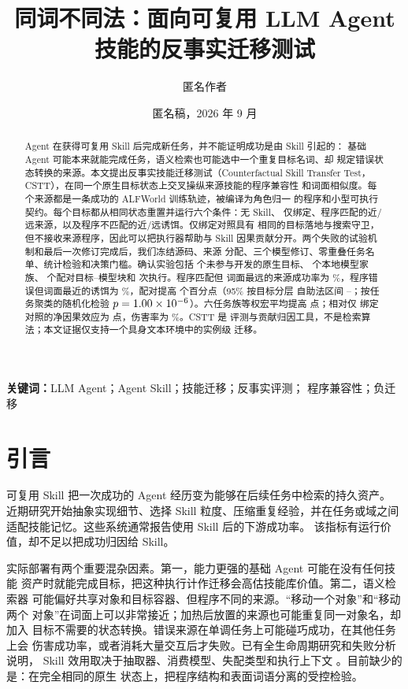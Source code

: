 \documentclass[10pt]{article}
\title{同词不同法：面向可复用 LLM Agent 技能的反事实迁移测试}
\author{匿名作者}
\date{匿名稿，2026 年 9 月}
\begin{document}
\maketitle

\begin{abstract}
Agent 在获得可复用 Skill 后完成新任务，并不能证明成功是由 Skill 引起的：
基础 Agent 可能本来就能完成任务，语义检索也可能选中一个重复目标名词、却
规定错误状态转换的来源。本文提出反事实技能迁移测试（Counterfactual Skill
Transfer Test，CSTT），在同一个原生目标状态上交叉操纵来源技能的程序兼容性
和词面相似度。每个来源都是一条成功的 ALFWorld 训练轨迹，被编译为角色归一
的程序和小型可执行契约。每个目标都从相同状态重置并运行六个条件：无 Skill、
仅绑定、程序匹配的近/远来源，以及程序不匹配的近/远诱饵。仅绑定对照具有
相同的目标落地与搜索守卫，但不接收来源程序，因此可以把执行器帮助与 Skill
因果贡献分开。两个失败的试验机制和最后一次修订完成后，我们冻结源码、来源
分配、三个模型修订、零重叠任务名单、统计检验和决策门槛。确认实验包括
\TargetCount{} 个未参与开发的原生目标、\ModelCount{} 个本地模型家族、
\BlockCount{} 个配对目标--模型块和 \EpisodeCount{} 次执行。程序匹配但
词面最远的来源成功率为 \MatchedFarRate\%，程序错误但词面最近的诱饵为
\LureNearRate\%，配对提高 \PrimaryEffect{} 个百分点（95\% 按目标分层
自助法区间 \PrimaryCILow--\PrimaryCIHigh；按任务聚类的随机化检验
$p=1.00\times 10^{-6}$）。六任务族等权宏平均提高 \MacroEffect{} 点；相对仅
绑定对照的净因果效应为 \CausalNet{} 点，伤害率为 \HarmRate\%。CSTT 是
评测与贡献归因工具，不是检索算法；本文证据仅支持一个具身文本环境中的实例级
迁移。
\end{abstract}

\noindent\textbf{关键词：}LLM Agent；Agent Skill；技能迁移；反事实评测；
程序兼容性；负迁移

\section{引言}
可复用 Skill 把一次成功的 Agent 经历变为能够在后续任务中检索的持久资产。
近期研究开始抽象实现细节、选择 Skill 粒度、压缩重复经验，并在任务或域之间
适配技能记忆\citep{yu2026polyskill,feng2026breakdown,xu2026compression,
miao2026skilllens,he2026beyond}。这些系统通常报告使用 Skill 后的下游成功率。
该指标有运行价值，却不足以把成功归因给 Skill。

实际部署有两个重要混杂因素。第一，能力更强的基础 Agent 可能在没有任何技能
资产时就能完成目标，把这种执行计作迁移会高估技能库价值。第二，语义检索器
可能偏好共享对象和目标容器、但程序不同的来源。“移动一个对象”和“移动两个
对象”在词面上可以非常接近；加热后放置的来源也可能重复同一对象名，却加入
目标不需要的状态转换。错误来源在单调任务上可能碰巧成功，在其他任务上会
伤害成功率，或者消耗大量交互后才失败。已有全生命周期研究和失败分析说明，
Skill 效用取决于抽取器、消费模型、失配类型和执行上下文
\citep{huang2026consumption,dong2026harmful}。目前缺少的是：在完全相同的原生
状态上，把程序结构和表面词语分离的受控检验。
\end{document}

